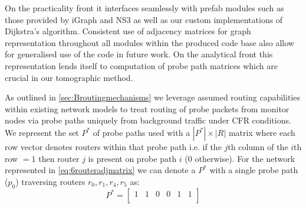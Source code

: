 On the practicality front it interfaces seamlessly with prefab modules such as those provided by iGraph and NS3 as well as our custom implementations of Dijkstra's algorithm. Consistent use of adjacency matrices for graph representation throughout all modules within the produced code base also allow for generalised use of the code in future work. On the analytical front this representation lends itself to computation of probe path matrices which are crucial in our tomographic method.\par
As outlined in \cref{sec:Broutingmechanisms} we leverage assumed routing capabilities within existing network models to treat routing of probe packets from monitor nodes via probe paths uniquely from background traffic under CFR conditions. We represent the set $P^*$ of probe paths used with a $|P^*|\times |R|$ matrix where each row vector denotes routers within that probe path i.e. if the $j$th column of the $i$th row $= 1$ then router $j$ is present on probe path $i$ (0 otherwise). For the network represented in \cref{eq:6routeradjmatrix} we can denote a $P^*$ with a single probe path ($p_0$) traversing routers $r_0,r_1,r_4,r_5$ as:
\begin{equation*}
    P^*=\begin{bmatrix}
        1 & 1 & 0 & 0 & 1 & 1\\ 
    \end{bmatrix}
\end{equation*}

